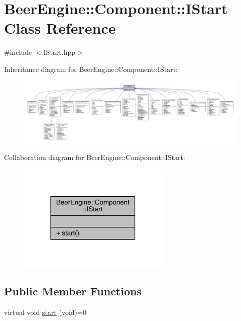 \hypertarget{class_beer_engine_1_1_component_1_1_i_start}{}\section{Beer\+Engine\+:\+:Component\+:\+:I\+Start Class Reference}
\label{class_beer_engine_1_1_component_1_1_i_start}


{\ttfamily \#include $<$I\+Start.\+hpp$>$}



Inheritance diagram for Beer\+Engine\+:\+:Component\+:\+:I\+Start\+:\nopagebreak
\begin{figure}[H]
\begin{center}
\leavevmode
\includegraphics[width=350pt]{class_beer_engine_1_1_component_1_1_i_start__inherit__graph}
\end{center}
\end{figure}


Collaboration diagram for Beer\+Engine\+:\+:Component\+:\+:I\+Start\+:\nopagebreak
\begin{figure}[H]
\begin{center}
\leavevmode
\includegraphics[width=206pt]{class_beer_engine_1_1_component_1_1_i_start__coll__graph}
\end{center}
\end{figure}
\subsection*{Public Member Functions}
\begin{DoxyCompactItemize}
\item 
virtual void \mbox{\hyperlink{class_beer_engine_1_1_component_1_1_i_start_aa3e25e86e20c46cdaefc6f6d7f21e495}{start}} (void)=0
\end{DoxyCompactItemize}


